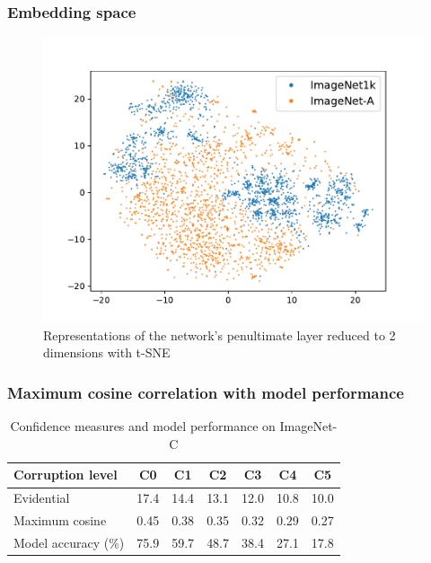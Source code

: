 \documentclass[]{beamer}
\begin{document}
\begin{frame} \frametitle{Embedding space}
\begin{figure}[H]
    \caption{Representations of the network's penultimate layer reduced to 2 dimensions with t-SNE}
    \centering
    \includegraphics[scale=0.5]{tsne_1k_A.pdf}
\end{figure}
\end{frame}

\begin{frame} \frametitle{Maximum cosine correlation with model performance}
\begin{table}[H]
    \caption{Confidence measures and model performance on ImageNet-C}
    \begin{center}
    \begin{small}
        \begin{tabular}{ l | c c c c c c }
            \toprule
            Corruption level & C0 & C1 & C2 & C3 & C4 & C5 \\
            \midrule
            Evidential
            & 17.4 & 14.4 & 13.1 & 12.0 & 10.8 & 10.0 \\
            Maximum cosine
            & 0.45 & 0.38 & 0.35 & 0.32 & 0.29 & 0.27 \\
            Model accuracy (\%)
            & 75.9 & 59.7 & 48.7 & 38.4 & 27.1 & 17.8 \\
            \bottomrule
        \end{tabular}
    \end{small}
    \end{center}
\end{table}
\end{frame}
\end{document}
